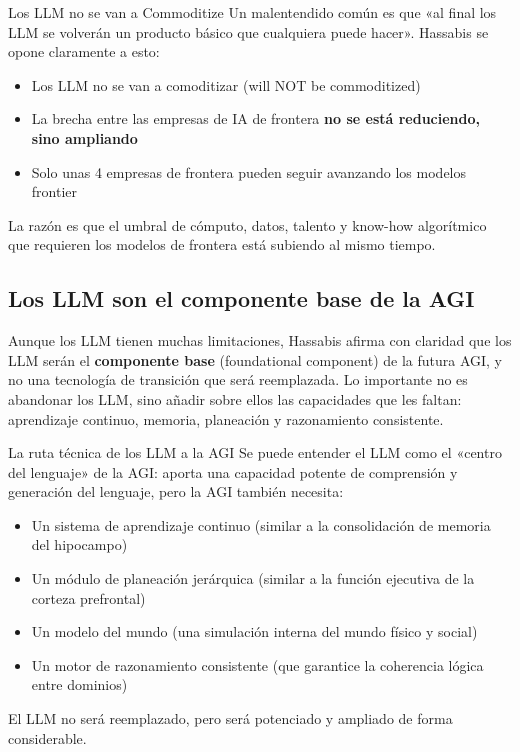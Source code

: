 \begin{warningbox}{Los LLM no se van a Commoditize}
Un malentendido común es que «al final los LLM se volverán un producto básico que cualquiera puede hacer». Hassabis se opone claramente a esto:
\begin{itemize}
    \item Los LLM no se van a comoditizar (will NOT be commoditized)
    \item La brecha entre las empresas de IA de frontera \textbf{no se está reduciendo, sino ampliando}
    \item Solo unas 4 empresas de frontera pueden seguir avanzando los modelos frontier
\end{itemize}
La razón es que el umbral de cómputo, datos, talento y know-how algorítmico que requieren los modelos de frontera está subiendo al mismo tiempo.
\end{warningbox}

\subsection{Los LLM son el componente base de la AGI}

Aunque los LLM tienen muchas limitaciones, Hassabis afirma con claridad que los LLM serán el \textbf{componente base} (foundational component) de la futura AGI, y no una tecnología de transición que será reemplazada. Lo importante no es abandonar los LLM, sino añadir sobre ellos las capacidades que les faltan: aprendizaje continuo, memoria, planeación y razonamiento consistente.

\begin{knowledgebox}{La ruta técnica de los LLM a la AGI}
Se puede entender el LLM como el «centro del lenguaje» de la AGI: aporta una capacidad potente de comprensión y generación del lenguaje, pero la AGI también necesita:
\begin{itemize}
    \item Un sistema de aprendizaje continuo (similar a la consolidación de memoria del hipocampo)
    \item Un módulo de planeación jerárquica (similar a la función ejecutiva de la corteza prefrontal)
    \item Un modelo del mundo (una simulación interna del mundo físico y social)
    \item Un motor de razonamiento consistente (que garantice la coherencia lógica entre dominios)
\end{itemize}
El LLM no será reemplazado, pero será potenciado y ampliado de forma considerable.
\end{knowledgebox}

